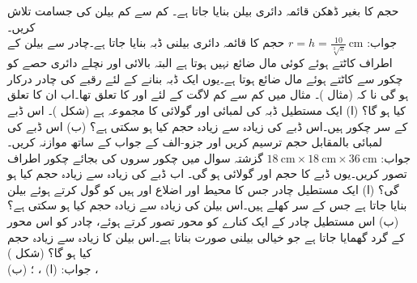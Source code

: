  حجم کا بغیر ڈھکن قائمہ دائری بیلن  بنایا جاتا ہے۔ کم سے کم بیلن کی جسامت تلاش کریں۔\\
جواب:\quad
$r=h=\tfrac{10}{\sqrt[3]{\pi}}\,\si{\centi\meter}$
 حجم کا  قائمہ دائری بیلنی ڈبہ  بنایا جاتا ہے۔چادر سے بیلن کے اطراف کاٹتے ہوئے کوئی مال ضائع نہیں ہوتا ہے البتہ بالائی اور نچلے دائری حصے کو  چکور سے کاٹتے ہوئے مال ضائع ہوتا ہے۔یوں ایک ڈبہ بنانے کے لئے  رقبے کی چادر درکار ہو گی نا کہ  (مثال )۔ مثال   میں کم سے کم لاگت کے لئے  اور  کا تعلق   تھا۔اب ان کا تعلق کیا ہو گا؟
(ا) ایک مستطیل ڈبہ کی لمبائی اور گولائی کا مجموعہ  ہے (شکل )۔ اس ڈبے  کے سر چکور ہیں۔اس ڈبے کی زیادہ سے زیادہ حجم کیا ہو سکتی ہے؟   (ب) اس ڈبے کی لمبائی بالمقابل حجم ترسیم کریں اور جزو-الف کے جواب کے ساتھ موازنہ کریں۔\\
جواب:\quad
$\SI{18}{\centi\meter}\times\SI{18}{\centi\meter}\times \SI{36}{\centi\meter}$
گزشتہ سوال میں چکور سروں کی بجائے چکور اطراف تصور کریں۔یوں ڈبے کا حجم  اور  گولائی  ہو گی۔ اب ڈبے کی زیادہ سے زیادہ حجم کیا ہو گی؟
(ا) ایک مستطیل چادر جس کا محیط  اور  اضلاع  اور  ہیں کو گول کرتے ہوئے بیلن بنایا جاتا ہے جس کے سر کھلے ہیں۔اس بیلن کی زیادہ سے زیادہ حجم کیا ہو سکتی ہے؟ (ب) اس مستطیل چادر کے ایک کنارے کو محور تصور کرتے ہوئے، چادر کو اس محور کے گرد گھمایا جاتا ہے جو خیالی بیلنی صورت بناتا ہے۔اس بیلن کا زیادہ سے زیادہ حجم کیا ہو گا؟   (شکل )\\
جواب:\quad
(ا) ، ؛ (ب)  ، 
